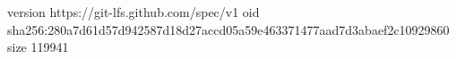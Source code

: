 version https://git-lfs.github.com/spec/v1
oid sha256:280a7d61d57d942587d18d27accd05a59e463371477aad7d3abaef2c10929860
size 119941
